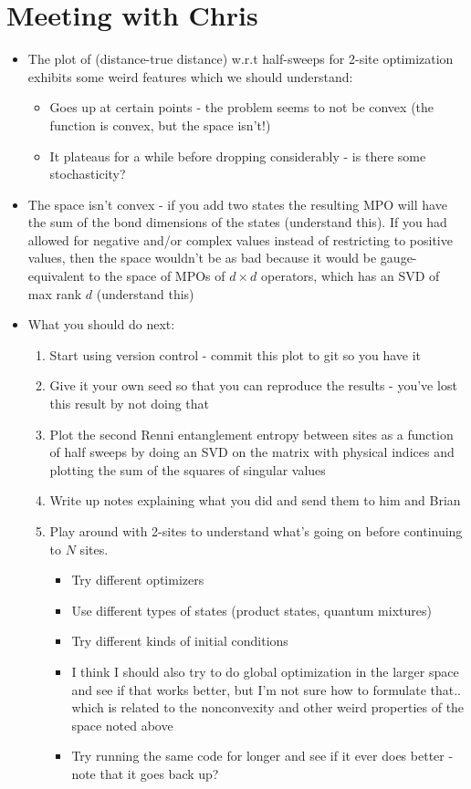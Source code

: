 \documentclass{report}
\begin{document}
\section{Meeting with Chris}

\begin{itemize}
\item The plot of (distance-true distance) w.r.t half-sweeps for 2-site optimization exhibits some weird features which we should understand:
	\begin{itemize}
	\item Goes up at certain points - the problem seems to not be convex (the function is convex, but the space isn't!)
	\item It plateaus for a while before dropping considerably - is there some stochasticity?
	\end{itemize}
\item The space isn't convex - if you add two states the resulting MPO will have the sum of the bond dimensions of the states (\todo understand this). If you had allowed for negative and/or complex values instead of restricting to positive values, then the space wouldn't be as bad because it would be gauge-equivalent to the space of MPOs of $d\times d$ operators, which has an SVD of max rank $d$ (\todo understand this)
\item What you should do next:
	\begin{enumerate}
	\item Start using version control - commit this plot to git so you have it
	\item Give it your own seed so that you can reproduce the results - you've lost this result by not doing that
	\item Plot the second Renni entanglement entropy between sites as a function of half sweeps by doing an SVD on the matrix with physical indices and plotting the sum of the squares of singular values
	\item Write up notes explaining what you did and send them to him and Brian
	\item Play around with 2-sites to understand what's going on before continuing to $N$ sites. 
		\begin{itemize}
		\item Try different optimizers 
		\item Use different types of states (product states, quantum mixtures)
		\item Try different kinds of initial conditions
		\item  I think I should also try to do global optimization in the larger space and see if that works better, but I'm not sure how to formulate that.. which is related to the nonconvexity and other weird properties of the space noted above
		\item Try running the same code for longer and see if it ever does better - note that it goes back up?
		\end{itemize}
	\end{enumerate}
\end{itemize}
\end{document}
